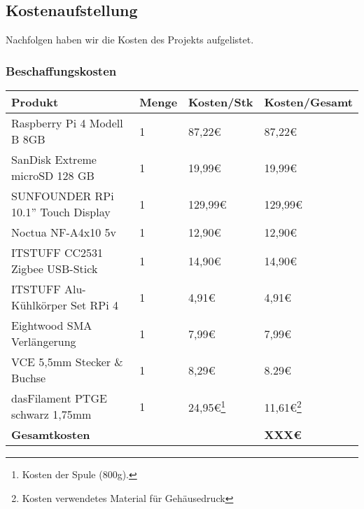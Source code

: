 \subsection{Kostenaufstellung}\label{ku_kosten}
Nachfolgen haben wir die Kosten des Projekts aufgelistet.\par
\subsubsection{Beschaffungskosten}
\begin{center}
\begin{tabularx}{\textwidth}{|p{5.6cm}|p{1.2cm}|p{3.5cm}|p{3.5cm}|}
 	\hline
 	\textbf{Produkt} & \textbf{Menge} & \textbf{Kosten/Stk}  & \textbf{Kosten/Gesamt}\\
	\hline
	Raspberry Pi 4 Modell B 8GB & 1 & 87,22\euro{} & 87,22\euro{} \\
	\hline
	SanDisk Extreme microSD 128 GB & 1 & 19,99\euro{} & 19,99\euro{} \\
	\hline
	SUNFOUNDER RPi 10.1'' Touch Display & 1 & 129,99\euro{} & 129,99\euro{} \\
	\hline
	Noctua NF-A4x10 5v & 1 & 12,90\euro{} & 12,90\euro{} \\
	\hline
	ITSTUFF CC2531 Zigbee USB-Stick & 1 & 14,90\euro{} & 14,90\euro{} \\
	\hline
	ITSTUFF Alu-Kühlkörper Set RPi 4 & 1 & 4,91\euro{} & 4,91\euro{} \\
	\hline
	Eightwood SMA Verlängerung & 1 & 7,99\euro{} & 7,99\euro{} \\ 
	\hline
	VCE 5,5mm Stecker \& Buchse & 1 & 8,29\euro{} & 8.29\euro{} \\
	\hline
	dasFilament PTGE schwarz 1,75mm & 1 & 24,95\euro{}\footnote{Kosten der Spule (800g).} & 11,61\euro{}\footnote{Kosten verwendetes Material für Gehäusedruck} \\
	\hline
	\textbf{Gesamtkosten} &  &  & \textbf{XXX\euro{}} \\ %
	\hline
\end{tabularx}
\end{center}

